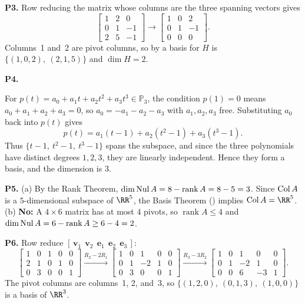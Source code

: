 \documentclass[10pt]{scrartcl}
\newcommand{\vv}[1]{\mathbf{#1}}
\begin{document}
\begin{prob}\textbf{P3.}
Row reducing the matrix whose columns are the three spanning vectors gives
\[
  \begin{bmatrix} 1 & 2 & 0 \\ 0 & 1 & -1 \\ 2 & 5 & -1 \end{bmatrix}
  \to
  \begin{bmatrix} 1 & 0 & 2 \\ 0 & 1 & -1 \\ 0 & 0 & 0 \end{bmatrix}.
\]
Columns~1 and~2 are pivot columns, so by  a basis for $H$ is $\big\{(1,0,2),\ (2,1,5)\big\}$ and $\dim H=2$.
\end{prob}

\begin{prob}\textbf{P4.}\par{}
For $p(t)=a_0+a_1t+a_2t^2+a_3t^3\in\mathbb{P}_3$, the condition $p(1)=0$ means $a_0+a_1+a_2+a_3=0$, so $a_0=-a_1-a_2-a_3$ with $a_1,a_2,a_3$ free. Substituting $a_0$ back into $p(t)$ gives
\[
  p(t) = a_1(t-1) + a_2(t^2-1) + a_3(t^3-1).
\]
Thus $\big\{t-1,\ t^2-1,\ t^3-1\big\}$ spans the subspace, and since the three polynomials have distinct degrees $1,2,3$, they are linearly independent. Hence they form a basis, and the dimension is $3$.
\end{prob}

\begin{prob}\textbf{P5.}
(a) By the Rank Theorem, $\dim\operatorname{Nul} A=8-\operatorname{rank}A=8-5=3$. Since $\operatorname{Col} A$ is a $5$-dimensional subspace of $\RR^5$, the Basis Theorem () implies $\Col A=\RR^5$.
(b) \textbf{No:} A $4\times 6$ matrix has at most $4$ pivots, so $\operatorname{rank}A\le 4$ and $\dim\operatorname{Nul} A=6-\operatorname{rank}A\ge 6-4=2$.
\end{prob}

\begin{prob}\textbf{P6.}
Row reduce $[\,\vv v_1\ \ \vv v_2\ \ \vv e_1\ \ \vv e_2\ \ \vv e_3\,]$:
\[
  \begin{bmatrix} 1 & 0 & 1 & 0 & 0 \\ 2 & 1 & 0 & 1 & 0 \\ 0 & 3 & 0 & 0 & 1 \end{bmatrix}
  \xrightarrow{R_2-2R_1}
  \begin{bmatrix} 1 & 0 & 1 & 0 & 0 \\ 0 & 1 & -2 & 1 & 0 \\ 0 & 3 & 0 & 0 & 1 \end{bmatrix}
  \xrightarrow{R_3-3R_2}
  \begin{bmatrix} 1 & 0 & 1 & 0 & 0 \\ 0 & 1 & -2 & 1 & 0 \\ 0 & 0 & 6 & -3 & 1 \end{bmatrix}.
\]
The pivot columns are columns~1, 2, and~3, so $\big\{(1,2,0),\ (0,1,3),\ (1,0,0)\big\}$ is a basis of $\RR^3$.
\end{prob}
\end{document}
